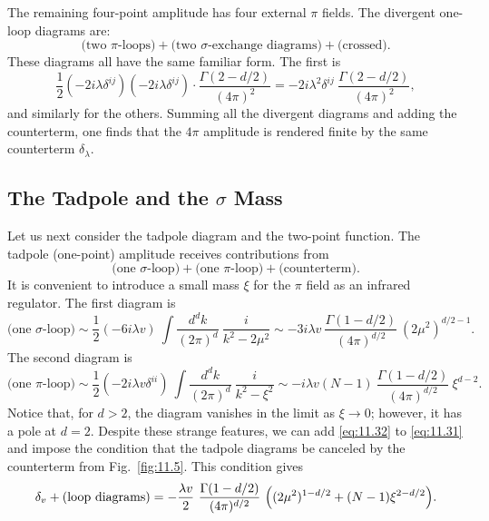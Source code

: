 The remaining four-point amplitude has four external $\pi$ fields.  The
divergent one-loop diagrams are:
\begin{equation}
  \text{(two $\pi$-loops)} + \text{(two $\sigma$-exchange diagrams)}
    + \text{(crossed)} .
\end{equation}
These diagrams all have the same familiar form.  The first is
\begin{equation}
  \frac{1}{2}(-2i\lambda\delta^{ij})(-2i\lambda\delta^{ij})\cdot
    \frac{\Gamma(2-d/2)}{(4\pi)^2}
  = -2i\lambda^2\delta^{ij}\ \frac{\Gamma(2-d/2)}{(4\pi)^2} ,
  \label{eq:11.25}
\end{equation}
and similarly for the others.  Summing all the divergent diagrams and adding
the counterterm, one finds that the $4\pi$ amplitude is rendered finite by
the same counterterm $\delta_\lambda$.

\subsection{The Tadpole and the $\sigma$ Mass}

Let us next consider the tadpole diagram and the two-point function.  The
tadpole (one-point) amplitude receives contributions from
\begin{equation}
  \text{(one $\sigma$-loop)} + \text{(one $\pi$-loop)} + \text{(counterterm)} .
  \label{eq:11.30}
\end{equation}
It is convenient to introduce a small mass $\xi$ for the $\pi$ field as an
infrared regulator.  The first diagram is
\begin{equation}
  \text{(one $\sigma$-loop)} \sim \frac{1}{2}(-6i\lambda v)\ \int
    \frac{d^dk}{(2\pi)^d}\ \frac{i}{k^2-2\mu^2}
  \sim -3i\lambda v\ \frac{\Gamma(1-d/2)}{(4\pi)^{d/2}}\ (2\mu^2)^{d/2-1} .
  \label{eq:11.31}
\end{equation}
The second diagram is
\begin{equation}
  \text{(one $\pi$-loop)} \sim \frac{1}{2}(-2i\lambda v\delta^{ii})\ \int
    \frac{d^dk}{(2\pi)^d}\ \frac{i}{k^2-\xi^2}
  \sim -i\lambda v(N-1)\ \frac{\Gamma(1-d/2)}{(4\pi)^{d/2}}\ \xi^{d-2} .
  \label{eq:11.32}
\end{equation}
Notice that, for $d > 2$, the diagram vanishes in the limit as $\xi\to 0$;
however, it has a pole at $d = 2$.  Despite these strange features, we can add
\eqref{eq:11.32} to \eqref{eq:11.31} and impose the condition that the
tadpole diagrams be canceled by the counterterm from Fig.~\ref{fig:11.5}.
This condition gives
\begin{equation}
  \delta_v + (\text{loop diagrams}) = -\frac{\lambda v}{2}\ \frac{\Gamma(1-d/2)}
    {(4\pi)^{d/2}}\ \Bigl( (2\mu^2)^{1-d/2} + (N-1)\xi^{2-d/2} \Bigr) .
  \label{eq:11.33}
\end{equation}


